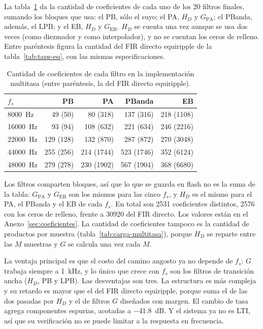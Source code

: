 \documentclass[11pt,a4paper]{article}
\begin{document}
La tabla~\ref{tab:taps-multitasa} da la cantidad de coeficientes de cada uno
de los 20 filtros finales, sumando los bloques que usa: el PB, sólo el suyo;
el PA, $H_D$ y $G_{\text{PA}}$; el PBanda, además, el LPB; y el EB, $H_D$ y
$G_{\text{EB}}$. $H_D$ se cuenta una vez aunque se usa dos veces (como
diezmador y como interpolador), y no se cuentan los ceros de relleno. Entre
paréntesis figura la cantidad del FIR directo equiripple de la
tabla~\ref{tab:taps-eq}, con las mismas especificaciones.

\begin{table}[H]
\centering
\caption{Cantidad de coeficientes de cada filtro en la implementación
multitasa (entre paréntesis, la del FIR directo equiripple).}
\label{tab:taps-multitasa}
\begin{tabular}{@{}l r r r r@{}}
\toprule
\textbf{$f_s$} & \textbf{PB} & \textbf{PA} & \textbf{PBanda} & \textbf{EB}\\
\midrule
\qty{8000}{\hertz}  & 49 (50)   & 80 (318)   & 137 (316)  & 218 (\num{1108})\\
\qty{16000}{\hertz} & 93 (94)   & 108 (632)  & 221 (634)  & 246 (\num{2216})\\
\qty{22000}{\hertz} & 129 (128) & 132 (870)  & 287 (872)  & 270 (\num{3048})\\
\qty{44000}{\hertz} & 255 (256) & 214 (\num{1744}) & 523 (\num{1746}) & 352 (\num{6124})\\
\qty{48000}{\hertz} & 279 (278) & 230 (\num{1902}) & 567 (\num{1904}) & 368 (\num{6680})\\
\bottomrule
\end{tabular}
\end{table}

Los filtros comparten bloques, así que lo que se guarda en flash no es la
suma de la tabla: $G_{\text{PA}}$ y $G_{\text{EB}}$ son los mismos para las
cinco $f_s$, y $H_D$ es el mismo para el PA, el PBanda y el EB de cada
$f_s$. En total son \num{2531} coeficientes distintos, \num{2576} con los
ceros de relleno, frente a \num{30920} del FIR directo. Los valores están en
el Anexo~\ref{sec:coeficientes}. La cantidad de coeficientes tampoco es la
cantidad de productos por muestra (tabla~\ref{tab:carga-multitasa}), porque
$H_D$ se reparte entre las $M$ muestras y $G$ se calcula una vez cada $M$.

La ventaja principal es que el costo del camino angosto ya no depende de
$f_s$: $G$ trabaja siempre a \qty{1}{\kilo\hertz}, y lo único que crece con
$f_s$ son los filtros de transición ancha ($H_D$, PB y LPB). Las desventajas
son tres. La estructura es más compleja y su retardo es mayor que el del FIR
directo equiripple, porque suma el de las dos pasadas por $H_D$ y el de
filtros $G$ diseñados con margen. El cambio de tasa agrega componentes
espurias, acotadas a \qty{-41.8}{\deci\bel}. Y el sistema ya no es LTI, así
que su verificación no se puede limitar a la respuesta en frecuencia.
\end{document}

